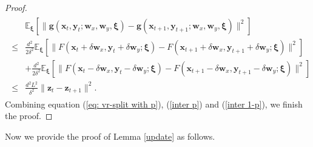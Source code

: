 \documentclass[11pt]{article}
\def\vg{\mathbf{g}}
\def\vw{\mathbf{w}}
\def\vx{\mathbf{x}}
\def\vy{\mathbf{y}}
\def\vz{\mathbf{z}}
\def\vxi{\bm{\xi}}
\begin{document}
\begin{proof}
\begin{align}\label{gx_1-gx_2}
\begin{split}
    &\mathbb{E}_{\vxi}\left[\|\vg(\vx_{t},\vy_{t};\vw_x,\vw_y,\vxi)-\vg(\vx_{t+1},\vy_{t+1};\vw_x,\vw_y,\vxi) \|^2\right]\\
    \le& \frac{d^2}{2\delta^2}\mathbb{E}_{\vxi}\left[\|F(\vx_t+\delta \vw_x,\vy_t+\delta \vw_y;\vxi)-F(\vx_{t+1}+\delta \vw_x,\vy_{t+1}+\delta \vw_y;\vxi)\|^2\right]\\
    & + \frac{d^2}{2\delta^2}\mathbb{E}_{\vxi}\left[\|F(\vx_t-\delta \vw_x,\vy_t-\delta \vw_y;\vxi)-F(\vx_{t+1}-\delta \vw_x,\vy_{t+1}-\delta \vw_y;\vxi)\|^2\right] \\
    \le & \frac{d^2 L^2}{\delta^2}\|\vz_t-\vz_{t+1}\|^2.
\end{split}
\end{align}
Combining equation (\ref{eq: vr-split with p}), (\ref{inter p}) and (\ref{inter 1-p}), we finish the proof.
\end{proof} 

Now we provide the proof of Lemma \ref{update} as follows.
\end{document}
